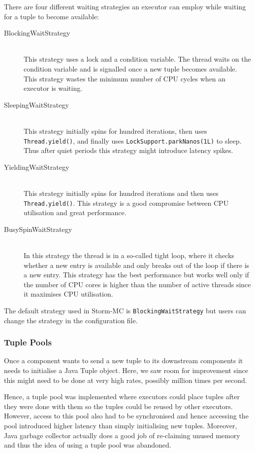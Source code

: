 There are four different waiting strategies an executor can employ while waiting for a tuple to become available:

\begin{description}
	\item[BlockingWaitStrategy] \hfill \\
	This strategy uses a lock and a condition variable. The thread waits on the condition variable and is signalled once a new tuple becomes available. This strategy wastes the minimum number of CPU cycles when an executor is waiting.
	\item[SleepingWaitStrategy] \hfill \\
	This strategy initially spins for hundred iterations, then uses \texttt{Thread.yield()}, and finally uses \texttt{LockSupport.parkNanos(1L)} to sleep. Thus after quiet periods this strategy might introduce latency spikes.
	\item[YieldingWaitStrategy] \hfill \\
	This strategy initially spins for hundred iterations and then uses \texttt{Thread.yield()}. This strategy is a good compromise between CPU utilisation and great performance.
	\item[BusySpinWaitStrategy] \hfill \\
	In this strategy the thread is in a so-called tight loop, where it checks whether a new entry is available and only breaks out of the loop if there is a new entry. This strategy has the best performance but works well only if the number of CPU cores is higher than the number of active threads since it maximises CPU utilisation.
\end{description}

The default strategy used in Storm-MC is \texttt{BlockingWaitStrategy} but users can change the strategy in the configuration file.

\subsubsection{Tuple Pools}

Once a component wants to send a new tuple to its downstream components it needs to initialise a Java Tuple object. Here, we saw room for improvement since this might need to be done at very high rates, possibly million times per second.

Hence, a tuple pool was implemented where executors could place tuples after they were done with them so the tuples could be reused by other executors. However, access to this pool also had to be synchronised and hence accessing the pool introduced higher latency than simply initialising new tuples. Moreover, Java garbage collector actually does a good job of re-claiming unused memory and thus the idea of using a tuple pool was abandoned.

